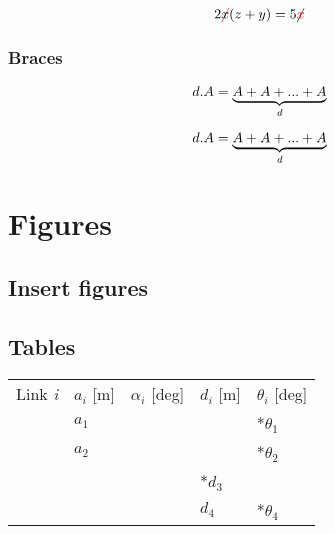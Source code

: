 \begin{equation*}
    2\textcolor{red}{\cancel{\textcolor{black}{x}}} (z+y) = 5\cancel{\textcolor{red}{x}}
\end{equation*}

\subsubsection{Braces}

\begin{TeXlstlisting}
\begin{equation*}
    d.A =  \underbrace{A+A+...+A}_\text{\textit{d}}
\end{equation*}
\end{TeXlstlisting}

\begin{equation*}
    d.A =  \underbrace{A+A+...+A}_\text{\textit{d}}
\end{equation*}


\section{Figures}

\subsection{Insert figures}

\begin{TeXlstlisting}
\end{TeXlstlisting}

\subsection{Tables}

\begin{TeXlstlisting}
\begin{tabular} {    |>{\centering\arraybackslash}p{3cm}|
    |>{\centering\arraybackslash}p{3cm}|
    >{\centering\arraybackslash}p{3cm}|
    >{\centering\arraybackslash}p{3cm}|
    >{\centering\arraybackslash}p{3cm}|  
                }
\hline
\multicolumn{5}{|c|}{DH Parameter for SCARA manipulator} \\
\hline
Link \textit{i} & $a_i$ [m] & $\alpha_i$ [deg] & $d_i$ [m] & $\theta_i$ [deg] \\
\hline
1 & $a_1$   & 0     & 0     & *$\theta_1$\\
2 & $a_2$   & 180   & 0     & *$\theta_2$\\
3 & 0       & 0     & *$d_3$ & 0         \\
4 & 0       & 0     & $d_4$ & *$\theta_4$\\
\hline
\end{tabular}
\end{TeXlstlisting}

